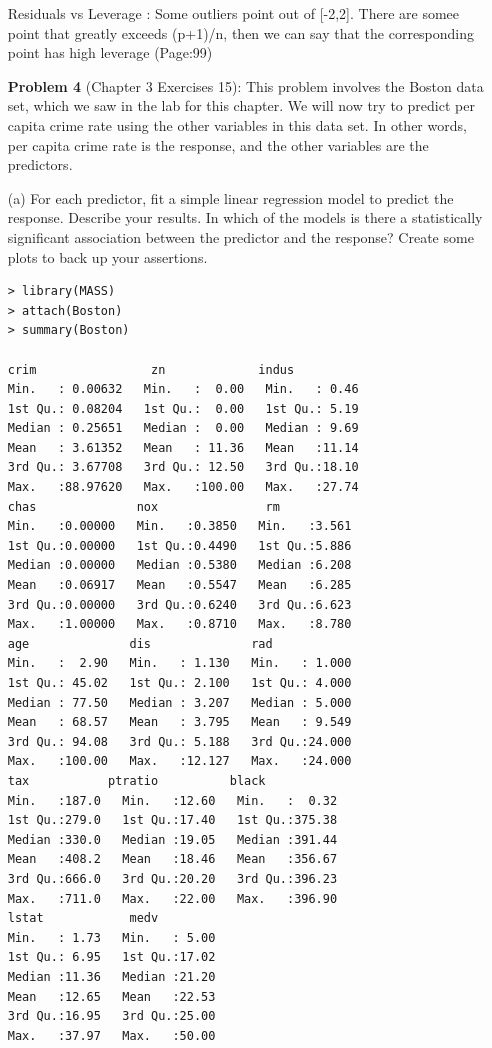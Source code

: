 \documentclass{article}
\begin{document}
\begin{itemize}
Residuals vs Leverage : Some outliers point out of [-2,2]. There are somee point that greatly exceeds (p+1)/n, then we can say that the corresponding point has high leverage (Page:99)

\newpage

\newpage
{\bf Problem 4} (Chapter 3 Exercises 15): This problem involves the Boston data set, which we saw in the lab for this chapter. We will now try to predict per capita crime rate using the other variables in this data set. In other words, per capita crime rate is the response, and the other variables are the predictors.

\item[(a)] For each predictor, fit a simple linear regression model to predict the response. Describe your results. In which of the models is there a statistically significant association between the predictor and the response? Create some plots to back up your assertions.



\begin{program}
	\begin{verbatim}
> library(MASS)
> attach(Boston)
> summary(Boston)

crim                zn             indus      
Min.   : 0.00632   Min.   :  0.00   Min.   : 0.46  
1st Qu.: 0.08204   1st Qu.:  0.00   1st Qu.: 5.19  
Median : 0.25651   Median :  0.00   Median : 9.69  
Mean   : 3.61352   Mean   : 11.36   Mean   :11.14  
3rd Qu.: 3.67708   3rd Qu.: 12.50   3rd Qu.:18.10  
Max.   :88.97620   Max.   :100.00   Max.   :27.74  
chas              nox               rm       
Min.   :0.00000   Min.   :0.3850   Min.   :3.561  
1st Qu.:0.00000   1st Qu.:0.4490   1st Qu.:5.886  
Median :0.00000   Median :0.5380   Median :6.208  
Mean   :0.06917   Mean   :0.5547   Mean   :6.285  
3rd Qu.:0.00000   3rd Qu.:0.6240   3rd Qu.:6.623  
Max.   :1.00000   Max.   :0.8710   Max.   :8.780  
age              dis              rad        
Min.   :  2.90   Min.   : 1.130   Min.   : 1.000  
1st Qu.: 45.02   1st Qu.: 2.100   1st Qu.: 4.000  
Median : 77.50   Median : 3.207   Median : 5.000  
Mean   : 68.57   Mean   : 3.795   Mean   : 9.549  
3rd Qu.: 94.08   3rd Qu.: 5.188   3rd Qu.:24.000  
Max.   :100.00   Max.   :12.127   Max.   :24.000  
tax           ptratio          black       
Min.   :187.0   Min.   :12.60   Min.   :  0.32  
1st Qu.:279.0   1st Qu.:17.40   1st Qu.:375.38  
Median :330.0   Median :19.05   Median :391.44  
Mean   :408.2   Mean   :18.46   Mean   :356.67  
3rd Qu.:666.0   3rd Qu.:20.20   3rd Qu.:396.23  
Max.   :711.0   Max.   :22.00   Max.   :396.90  
lstat            medv      
Min.   : 1.73   Min.   : 5.00  
1st Qu.: 6.95   1st Qu.:17.02  
Median :11.36   Median :21.20  
Mean   :12.65   Mean   :22.53  
3rd Qu.:16.95   3rd Qu.:25.00  
Max.   :37.97   Max.   :50.00  
	\end{verbatim}
\end{program}





\end{itemize}
\end{document}
